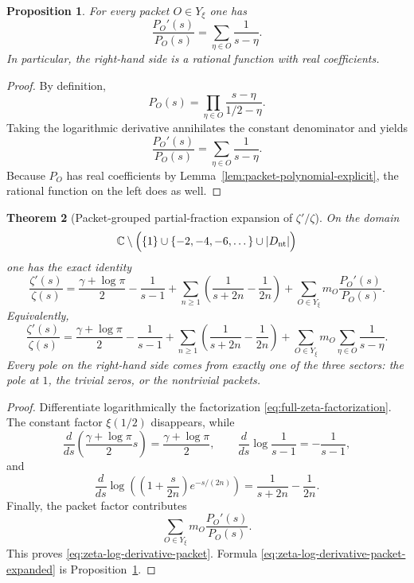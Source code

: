 \documentclass[11pt,a4paper]{article}
\newtheorem{theorem}{Theorem}[section]
\newtheorem{proposition}[theorem]{Proposition}
\theoremstyle{definition}
\theoremstyle{remark}
\newcommand{\CC}{\mathbb C}
\begin{document}
\begin{proposition}\label{prop:packet-log-derivative}
For every packet $O\in Y_\xi$ one has
\begin{equation}\label{eq:packet-log-derivative}
\frac{P_O'(s)}{P_O(s)}=\sum_{\eta\in O}\frac{1}{s-\eta}.
\end{equation}
In particular, the right-hand side is a rational function with real coefficients.
\end{proposition}

\begin{proof}
By definition,
\[
P_O(s)=\prod_{\eta\in O}\frac{s-\eta}{1/2-\eta}.
\]
Taking the logarithmic derivative annihilates the constant denominator and yields
\[
\frac{P_O'(s)}{P_O(s)}=\sum_{\eta\in O}\frac{1}{s-\eta}.
\]
Because $P_O$ has real coefficients by Lemma~\ref{lem:packet-polynomial-explicit}, the rational function on the left does as well.
\end{proof}

\begin{theorem}[Packet-grouped partial-fraction expansion of $\zeta'/\zeta$]\label{thm:zeta-log-derivative-packet}
On the domain
\[
\CC\setminus\Bigl(\{1\}\cup\{-2,-4,-6,\dots\}\cup |D_{\mathrm{nt}}|\Bigr)
\]
one has the exact identity
\begin{equation}\label{eq:zeta-log-derivative-packet}
\frac{\zeta'(s)}{\zeta(s)}
=
\frac{\gamma+\log\pi}{2}
-\frac{1}{s-1}
+\sum_{n\ge 1}\left(\frac{1}{s+2n}-\frac{1}{2n}\right)
+\sum_{O\in Y_\xi} m_O\frac{P_O'(s)}{P_O(s)}.
\end{equation}
Equivalently,
\begin{equation}\label{eq:zeta-log-derivative-packet-expanded}
\frac{\zeta'(s)}{\zeta(s)}
=
\frac{\gamma+\log\pi}{2}
-\frac{1}{s-1}
+\sum_{n\ge 1}\left(\frac{1}{s+2n}-\frac{1}{2n}\right)
+\sum_{O\in Y_\xi} m_O\sum_{\eta\in O}\frac{1}{s-\eta}.
\end{equation}
Every pole on the right-hand side comes from exactly one of the three sectors: the pole at $1$, the trivial zeros, or the nontrivial packets.
\end{theorem}

\begin{proof}
Differentiate logarithmically the factorization \eqref{eq:full-zeta-factorization}.  The constant factor $\xi(1/2)$ disappears, while
\[
\frac{d}{ds}\left(\frac{\gamma+\log\pi}{2}s\right)=\frac{\gamma+\log\pi}{2},
\qquad
\frac{d}{ds}\log\frac{1}{s-1}=-\frac{1}{s-1},
\]
and
\[
\frac{d}{ds}\log\left(\left(1+\frac{s}{2n}\right)e^{-s/(2n)}\right)
=\frac{1}{s+2n}-\frac{1}{2n}.
\]
Finally, the packet factor contributes
\[
\sum_{O\in Y_\xi} m_O\frac{P_O'(s)}{P_O(s)}.
\]
This proves \eqref{eq:zeta-log-derivative-packet}.  Formula \eqref{eq:zeta-log-derivative-packet-expanded} is Proposition~\ref{prop:packet-log-derivative}.
\end{proof}
\end{document}
